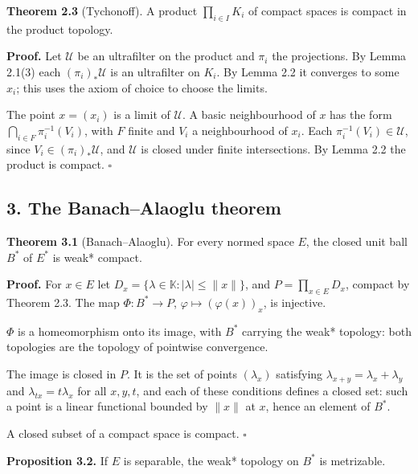 \documentclass[
  english,
  11pt,
  a4paper,
]{article}
\begin{document}
\textbf{Theorem 2.3} (Tychonoff). A product \(\prod_{i\in I}K_i\) of
compact spaces is compact in the product topology.

\textbf{Proof.} Let \(\mathcal U\) be an ultrafilter on the product and
\(\pi_i\) the projections. By Lemma 2.1(3) each \((\pi_i)_*\mathcal U\)
is an ultrafilter on \(K_i\). By Lemma 2.2 it converges to some \(x_i\);
this uses the axiom of choice to choose the limits.

The point \(x=(x_i)\) is a limit of \(\mathcal U\). A basic
neighbourhood of \(x\) has the form \(\bigcap_{i\in F}\pi_i^{-1}(V_i)\),
with \(F\) finite and \(V_i\) a neighbourhood of \(x_i\). Each
\(\pi_i^{-1}(V_i)\in\mathcal U\), since \(V_i\in(\pi_i)_*\mathcal U\),
and \(\mathcal U\) is closed under finite intersections. By Lemma 2.2
the product is compact. \(\square\)

\subsection[3. The Banach--Alaoglu
theorem]{\texorpdfstring{\protect\hypertarget{weak-topologies-tychonoff-banach-alaoglu-mazur-bipolars-krein-milman-and-eberlein-smulian--oa-fnd-wt-03}{}{}3.
The Banach--Alaoglu
theorem}{3. The Banach--Alaoglu theorem}}\label{weak-topologies-tychonoff-banach-alaoglu-mazur-bipolars-krein-milman-and-eberlein-smulian--OA-FND-WT-03}

\textbf{Theorem 3.1} (Banach--Alaoglu). For every normed space \(E\),
the closed unit ball \(B^*\) of \(E^*\) is weak* compact.

\textbf{Proof.} For \(x\in E\) let
\(D_x=\{\lambda\in\mathbb K:|\lambda|\le\|x\|\}\), and
\(P=\prod_{x\in E}D_x\), compact by Theorem 2.3. The map
\(\Phi:B^*\to P\), \(\varphi\mapsto(\varphi(x))_x\), is injective.

\(\Phi\) is a homeomorphism onto its image, with \(B^*\) carrying the
weak* topology: both topologies are the topology of pointwise
convergence.

The image is closed in \(P\). It is the set of points \((\lambda_x)\)
satisfying \(\lambda_{x+y}=\lambda_x+\lambda_y\) and
\(\lambda_{tx}=t\lambda_x\) for all \(x,y,t\), and each of these
conditions defines a closed set: such a point is a linear functional
bounded by \(\|x\|\) at \(x\), hence an element of \(B^*\).

A closed subset of a compact space is compact. \(\square\)

\textbf{Proposition 3.2.} If \(E\) is separable, the weak* topology on
\(B^*\) is metrizable.
\end{document}

